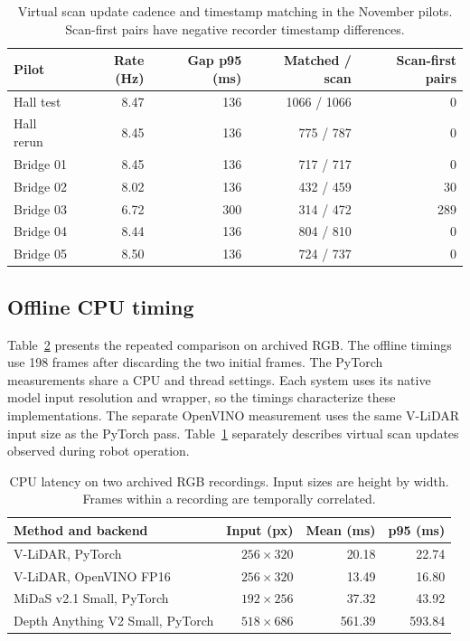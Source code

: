 \documentclass[pdflatex,sn-mathphys-num]{sn-jnl}
\begin{document}
\begin{table}[htbp]
\caption{Virtual scan update cadence and timestamp matching in the November pilots. Scan-first pairs have negative recorder timestamp differences.}
\label{tab:recorder-timing}
\centering
\begin{tabular}{@{}lrrrr@{}}
\toprule
Pilot & Rate (Hz) & Gap p95 (ms) & Matched / scan & Scan-first pairs \\
\midrule
Hall test & 8.47 & 136 & 1066 / 1066 & 0 \\
Hall rerun & 8.45 & 136 & 775 / 787 & 0 \\
Bridge 01 & 8.45 & 136 & 717 / 717 & 0 \\
Bridge 02 & 8.02 & 136 & 432 / 459 & 30 \\
Bridge 03 & 6.72 & 300 & 314 / 472 & 289 \\
Bridge 04 & 8.44 & 136 & 804 / 810 & 0 \\
Bridge 05 & 8.50 & 136 & 724 / 737 & 0 \\
\bottomrule
\end{tabular}
\end{table}

\subsection{Offline CPU timing}

Table~\ref{tab:timing} presents the repeated comparison on archived RGB. The offline timings use 198 frames after discarding the two initial frames. The PyTorch measurements share a CPU and thread settings. Each system uses its native model input resolution and wrapper, so the timings characterize these implementations. The separate OpenVINO measurement uses the same V-LiDAR input size as the PyTorch pass. Table~\ref{tab:recorder-timing} separately describes virtual scan updates observed during robot operation.

\begin{table}[htbp]
\caption{CPU latency on two archived RGB recordings. Input sizes are height by width. Frames within a recording are temporally correlated.}\label{tab:timing}
\centering
\begin{tabular}{@{}lrrr@{}}
\toprule
Method and backend & Input (px) & Mean (ms) & p95 (ms) \\
\midrule
V-LiDAR, PyTorch & $256 \times 320$ & 20.18 & 22.74 \\
V-LiDAR, OpenVINO FP16 & $256 \times 320$ & 13.49 & 16.80 \\
MiDaS v2.1 Small, PyTorch & $192 \times 256$ & 37.32 & 43.92 \\
Depth Anything V2 Small, PyTorch & $518 \times 686$ & 561.39 & 593.84 \\
\bottomrule
\end{tabular}
\end{table}
\end{document}
